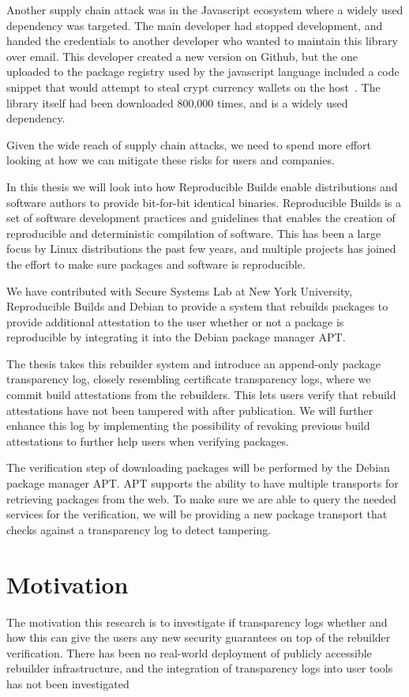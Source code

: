 \documentclass[../Main/thesis.tex]{subfiles}
\begin{document}
Another supply chain attack was in the Javascript ecosystem where a widely used
dependency was targeted. The main developer had stopped development, and handed
the credentials to another developer who wanted to maintain this library over
email. This developer created a new version on Github, but the one uploaded to
the package registry used by the javascript language included a code snippet
that would attempt to steal crypt currency wallets on the
host~\cite{malicious-npm}. The library itself had been downloaded 800,000 times,
and is a widely used dependency.

Given the wide reach of supply chain attacks, we need to spend more effort
looking at how we can mitigate these risks for users and companies.

In this thesis we will look into how Reproducible Builds enable distributions
and software authors to provide bit-for-bit identical binaries. Reproducible
Builds is a set of software development practices and guidelines that enables
the creation of reproducible and deterministic compilation of software. This has
been a large focus by Linux distributions the past few years, and multiple
projects has joined the effort to make sure packages and software is
reproducible.

We have contributed with Secure Systems Lab at New York University, Reproducible
Builds and Debian to provide a system that rebuilds packages to provide
additional attestation to the user whether or not a package is reproducible by
integrating it into the Debian package manager APT.

The thesis takes this rebuilder system and introduce an append-only package
transparency log, closely resembling certificate transparency logs, where we
commit build attestations from the rebuilders. This lets users verify that
rebuild attestations have not been tampered with after publication. We will
further enhance this log by implementing the possibility of revoking previous
build attestations to further help users when verifying packages.

The verification step of downloading packages will be performed by the Debian
package manager APT. APT supports the ability to have multiple transports for
retrieving packages from the web. To make sure we are able to query the needed
services for the verification, we will be providing a new package transport that
checks against a transparency log to detect tampering.

\section{Motivation}\label{sec:motivation}
The motivation this research is to investigate if transparency logs whether and
how this can give the users any new security guarantees on top of the rebuilder
verification. There has been no real-world deployment of publicly accessible
rebuilder infrastructure, and the integration of transparency logs into user
tools has not been investigated 
\end{document}
